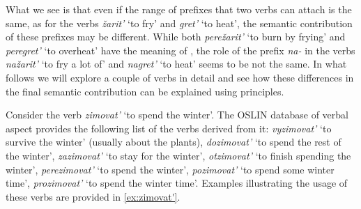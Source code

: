 What we see is that even if the range of prefixes that two verbs can attach is the same, as for the verbs \textit{\v{z}arit'} `to fry' and \textit{gret'} `to heat', the semantic contribution of these prefixes may be different. While both \textit{pere\v{z}arit'} `to burn by frying' and \textit{peregret'} `to overheat' have the meaning of , the role of the prefix \textit{na-} in the verbs \textit{na\v{z}arit'} `to fry a lot of' and \textit{nagret'} `to heat' seems to be not the same. In what follows we will explore a couple of verbs in detail and see how these differences in the final semantic contribution can be explained using  principles.

Consider the verb \textit{zimovat'} `to spend the winter'. The OSLIN database of verbal aspect provides the following list of the verbs derived from it: \textit{vyzimovat'} `to survive the winter' (usually about the plants), \textit{dozimovat'} `to spend the rest of the winter', \textit{zazimovat'} `to stay for the winter', \textit{otzimovat'} `to finish spending the winter', \textit{perezimovat'} `to spend the winter', \textit{pozimovat'} `to spend some winter time', \textit{prozimovat'} `to spend the winter time'. Examples illustrating the usage of these verbs are provided in \ref{ex:zimovat'}.

